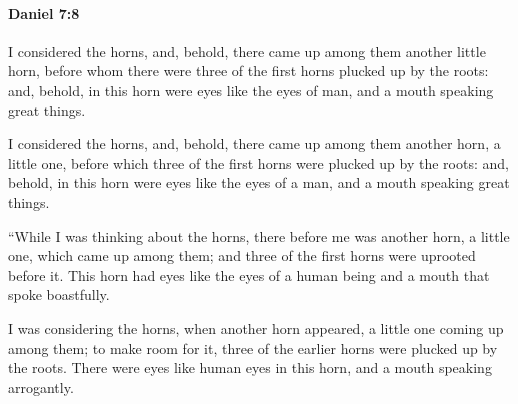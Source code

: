 		\paragraph{Daniel 7:8} %
			\label{DANIEL-7-8}

			I considered the horns, and, behold, there came up among them another little horn, before whom there were three of the first horns plucked up by the roots: and, behold, in this horn were eyes like the eyes of man, and a mouth speaking great things.

			\begin{versebox}
					\item[BHS] 
					\item[LXX] 
					\item[ASV] I considered the horns, and, behold, there came up among them another horn, a little one, before which three of the first horns were plucked up by the roots: and, behold, in this horn were eyes like the eyes of a man, and a mouth speaking great things.
					\item[NIV] “While I was thinking about the horns, there before me was another horn, a little one, which came up among them; and three of the first horns were uprooted before it. This horn had eyes like the eyes of a human being and a mouth that spoke boastfully.
					\item[NRSV] I was considering the horns, when another horn appeared, a little one coming up among them; to make room for it, three of the earlier horns were plucked up by the roots. There were eyes like human eyes in this horn, and a mouth speaking arrogantly.
			\end{versebox}

